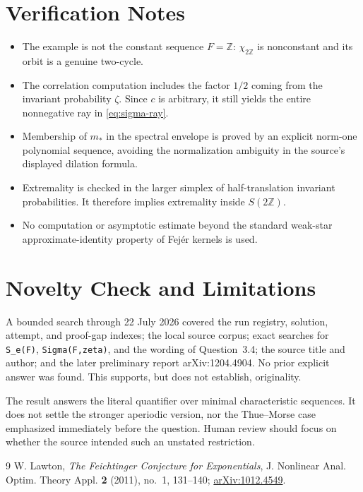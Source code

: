 \documentclass[11pt]{article}
\newcommand{\Z}{\mathbb Z}
\begin{document}
\section*{Verification Notes}

\begin{itemize}
\item The example is not the constant sequence $F=\Z$: $\chi_{2\Z}$ is
nonconstant and its orbit is a genuine two-cycle.
\item The correlation computation includes the factor $1/2$ coming from the
invariant probability $\zeta$. Since $c$ is arbitrary, it still yields the
entire nonnegative ray in \eqref{eq:sigma-ray}.
\item Membership of $m_*$ in the spectral envelope is proved by an explicit
norm-one polynomial sequence, avoiding the normalization ambiguity in the
source's displayed dilation formula.
\item Extremality is checked in the larger simplex of half-translation
invariant probabilities. It therefore implies extremality inside $S(2\Z)$.
\item No computation or asymptotic estimate beyond the standard weak-star
approximate-identity property of Fejér kernels is used.
\end{itemize}

\section*{Novelty Check and Limitations}

A bounded search through 22 July 2026 covered the run registry, solution,
attempt, and proof-gap indexes; the local source corpus; exact searches for
\texttt{S\_e(F)}, \texttt{Sigma(F,zeta)}, and the wording of Question~3.4;
the source title and author; and the later preliminary report
arXiv:1204.4904. No prior explicit answer was found. This supports, but does
not establish, originality.

The result answers the literal quantifier over minimal characteristic
sequences. It does not settle the stronger aperiodic version, nor the
Thue--Morse case emphasized immediately before the question. Human review
should focus on whether the source intended such an unstated restriction.

\begin{thebibliography}{9}
W. Lawton,
\emph{The Feichtinger Conjecture for Exponentials},
J. Nonlinear Anal. Optim. Theory Appl. \textbf{2} (2011), no.~1, 131--140;
\href{https://arxiv.org/abs/1012.4549}{arXiv:1012.4549}.
\end{thebibliography}
\end{document}
